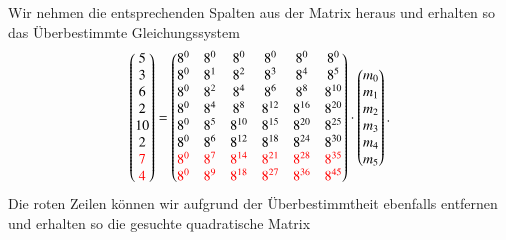 Wir nehmen die entsprechenden Spalten aus der Matrix heraus und erhalten so das Überbestimmte Gleichungssystem
\[
\begin{pmatrix}
	5 \\ 3 \\ 6 \\ 2 \\ 10 \\ 2 \\ \textcolor{red}{7} \\ \textcolor{red}{4} \\
\end{pmatrix}
=
\begin{pmatrix}
	8^0&    8^0&    8^0&    8^0&    8^0&    8^0\\
	8^0&	8^1&	8^2&	8^3&	8^4&	8^5\\
	8^0&	8^2&	8^4&	8^6&	8^8& 8^{10}\\
	8^0&	8^4&	8^8& 8^{12}& 8^{16}& 8^{20}\\
	8^0&	8^5& 8^{10}& 8^{15}& 8^{20}& 8^{25}\\
	8^0&	8^6& 8^{12}& 8^{18}& 8^{24}& 8^{30}\\
	\textcolor{red}{8^0}&	\textcolor{red}{8^7}& \textcolor{red}{8^{14}}& \textcolor{red}{8^{21}}& \textcolor{red}{8^{28}}& \textcolor{red}{8^{35}}\\
	\textcolor{red}{8^0}&	\textcolor{red}{8^9}& \textcolor{red}{8^{18}}& \textcolor{red}{8^{27}}& \textcolor{red}{8^{36}}& \textcolor{red}{8^{45}}\\
\end{pmatrix}
\cdot
\begin{pmatrix}
	m_0 \\ m_1 \\ m_2 \\ m_3 \\ m_4 \\ m_5 \\
\end{pmatrix}
.
\]
Die roten Zeilen können wir aufgrund der Überbestimmtheit ebenfalls entfernen und erhalten so die gesuchte quadratische Matrix
